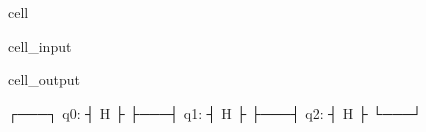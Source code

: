 \documentclass[letterpaper,10pt,english]{jupyterBook}
\begin{document}
\begin{sphinxuseclass}{cell}\begin{sphinxVerbatimInput}

\begin{sphinxuseclass}{cell_input}
\begin{sphinxVerbatim}[commandchars=\\\{\}]
   
   



\end{sphinxVerbatim}

\end{sphinxuseclass}\end{sphinxVerbatimInput}
\begin{sphinxVerbatimOutput}

\begin{sphinxuseclass}{cell_output}
\begin{sphinxVerbatim}[commandchars=\\\{\}]
     ┌───┐
q\PYGZus{}0: ┤ H ├
     ├───┤
q\PYGZus{}1: ┤ H ├
     ├───┤
q\PYGZus{}2: ┤ H ├
     └───┘
\end{sphinxVerbatim}

\end{sphinxuseclass}\end{sphinxVerbatimOutput}

\end{sphinxuseclass}
\end{document}
